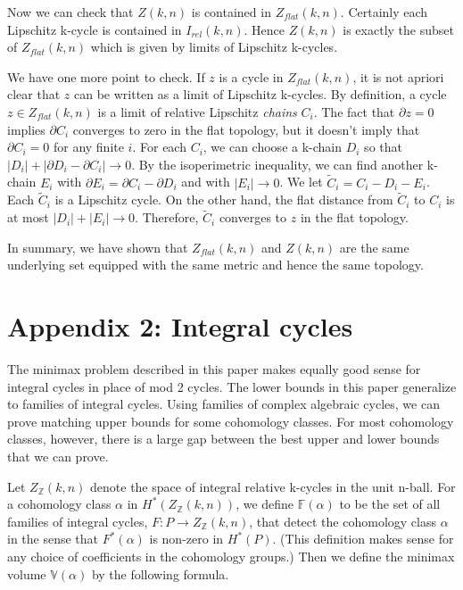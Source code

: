 \documentclass{amsart}
\newtheorem*{Theorem 1}{Theorem 1}
\newtheorem*{Theorem 2}{Theorem 2}
\newtheorem*{Theorem 1A}{Theorem 1A}
\newtheorem*{Theorem 2A}{Theorem 2A}
\newtheorem*{vanishing lemma}{Vanishing Lemma}
\numberwithin{equation}{section}
\begin{document}
Now we can check that $Z(k,n)$ is contained in $Z_{flat}(k,n)$. 
Certainly each Lipschitz k-cycle is contained in $I_{rel}(k,n)$.
Hence
$Z(k,n)$ is exactly the subset of $Z_{flat}(k,n)$ which is given
by limits of Lipschitz k-cycles.

We have one more point to check.  If $z$ is a cycle in
$Z_{flat}(k,n)$, it is not apriori clear that $z$ can be written
as a limit of Lipschitz k-cycles.  By definition, a cycle $z \in
Z_{flat}(k,n)$ is a limit of relative Lipschitz {\it chains}
$C_i$.  The fact that $\partial z = 0$ implies $\partial C_i$
converges to zero in the flat topology, but it doesn't imply that
$\partial C_i = 0$ for any finite $i$.  For each $C_i$, we can
choose a k-chain $D_i$ so that $|D_i| + |\partial D_i - \partial
C_i| \rightarrow 0$.  By the isoperimetric inequality, we can
find another k-chain $E_i$ with $\partial E_i = \partial C_i -
\partial D_i$ and with $|E_i| \rightarrow 0$.  We let $\tilde C_i
= C_i - D_i - E_i$.  Each $\tilde C_i$ is a Lipschitz cycle.  On
the other hand, the flat distance from $\tilde C_i$ to $C_i$ is
at most $|D_i| + |E_i| \rightarrow 0$. Therefore, $\tilde C_i$
converges to $z$ in the flat topology.

In summary, we have shown that $Z_{flat}(k,n)$ and $Z(k,n)$ are
the same underlying set equipped with the same metric and hence
the same topology.

\section{Appendix 2: Integral cycles}

The minimax problem described in this paper makes equally good
sense for integral cycles in place of mod 2 cycles.  The lower
bounds in this paper generalize to families of integral cycles. 
Using families of complex algebraic cycles, we can prove matching
upper bounds for some cohomology classes.  For most cohomology
classes, however, there is a large gap between the best upper and
lower bounds that we can prove.

Let $Z_{\mathbb{Z}}(k,n)$ denote the space of integral relative
k-cycles in the unit n-ball.  For a cohomology class $\alpha$ in
$H^*(Z_{\mathbb{Z}}(k,n))$, we define $\mathbb{F}(\alpha)$ to be
the set of all families of integral cycles, $F: P
\rightarrow Z_{\mathbb{Z}}(k,n)$, that detect the cohomology
class $\alpha$ in the sense that $F^*(\alpha)$ is non-zero in
$H^*(P)$.  (This definition makes sense for any choice of
coefficients in the cohomology groups.)  Then we define the
minimax volume $\mathbb{V}(\alpha)$ by the following formula.
\end{document}
